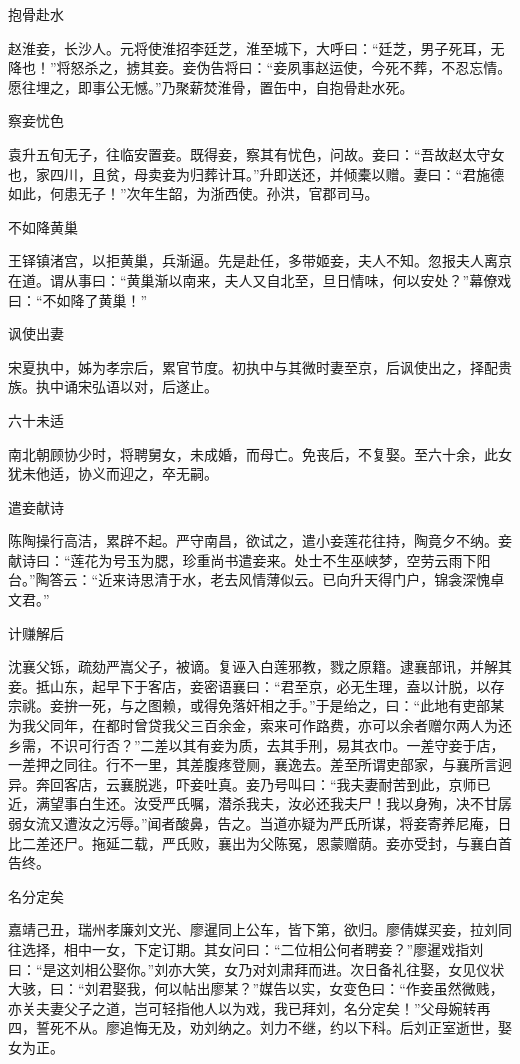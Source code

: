 \documentclass[a4paper,12pt,UTF8,twoside]{ctexbook}
\begin{document}
    抱骨赴水
    
    赵淮妾，长沙人。元将使淮招李廷芝，淮至城下，大呼曰：“廷芝，男子死耳，无降也！”将怒杀之，掳其妾。妾伪告将曰：“妾夙事赵运使，今死不葬，不忍忘情。愿往埋之，即事公无憾。”乃聚薪焚淮骨，置缶中，自抱骨赴水死。
    
    察妾忧色
    
    袁升五旬无子，往临安置妾。既得妾，察其有忧色，问故。妾曰：“吾故赵太守女也，家四川，且贫，母卖妾为归葬计耳。”升即送还，并倾橐以赠。妻曰：“君施德如此，何患无子！”次年生韶，为浙西使。孙洪，官郡司马。
    
    不如降黄巢
    
    王铎镇渚宫，以拒黄巢，兵渐逼。先是赴任，多带姬妾，夫人不知。忽报夫人离京在道。谓从事曰：“黄巢渐以南来，夫人又自北至，旦日情味，何以安处？”幕僚戏曰：“不如降了黄巢！”
    
    讽使出妻
    
    宋夏执中，姊为孝宗后，累官节度。初执中与其微时妻至京，后讽使出之，择配贵族。执中诵宋弘语以对，后遂止。
    
    六十未适
    
    南北朝顾协少时，将聘舅女，未成婚，而母亡。免丧后，不复娶。至六十余，此女犹未他适，协义而迎之，卒无嗣。
    
    遣妾献诗
    
    陈陶操行高洁，累辟不起。严守南昌，欲试之，遣小妾莲花往持，陶竟夕不纳。妾献诗曰：“莲花为号玉为腮，珍重尚书遣妾来。处士不生巫峡梦，空劳云雨下阳台。”陶答云：“近来诗思清于水，老去风情薄似云。已向升天得门户，锦衾深愧卓文君。”
    
    计赚解后
    
    沈襄父铄，疏劾严嵩父子，被谪。复诬入白莲邪教，戮之原籍。逮襄部讯，并解其妾。抵山东，起早下于客店，妾密语襄曰：“君至京，必无生理，盍以计脱，以存宗祧。妾拚一死，与之图赖，或得免落奸相之手。”于是绐之，曰：“此地有吏部某为我父同年，在都时曾贷我父三百余金，索来可作路费，亦可以余者赠尔两人为还乡需，不识可行否？”二差以其有妾为质，去其手刑，易其衣巾。一差守妾于店，一差押之同往。行不一里，其差腹疼登厕，襄逸去。差至所谓吏部家，与襄所言迥异。奔回客店，云襄脱逃，吓妾吐真。妾乃号叫曰：“我夫妻耐苦到此，京师已近，满望事白生还。汝受严氏嘱，潜杀我夫，汝必还我夫尸！我以身殉，决不甘孱弱女流又遭汝之污辱。”闻者酸鼻，告之。当道亦疑为严氏所谋，将妾寄养尼庵，日比二差还尸。拖延二载，严氏败，襄出为父陈冤，恩蒙赠荫。妾亦受封，与襄白首告终。
    
    名分定矣
    
    嘉靖己丑，瑞州孝廉刘文光、廖暹同上公车，皆下第，欲归。廖倩媒买妾，拉刘同往选择，相中一女，下定订期。其女问曰：“二位相公何者聘妾？”廖暹戏指刘曰：“是这刘相公娶你。”刘亦大笑，女乃对刘肃拜而进。次日备礼往娶，女见仪状大骇，曰：“刘君娶我，何以帖出廖某？”媒告以实，女变色曰：“作妾虽然微贱，亦关夫妻父子之道，岂可轻指他人以为戏，我已拜刘，名分定矣！”父母婉转再四，誓死不从。廖追悔无及，劝刘纳之。刘力不继，约以下科。后刘正室逝世，娶女为正。
    
\end{document}

